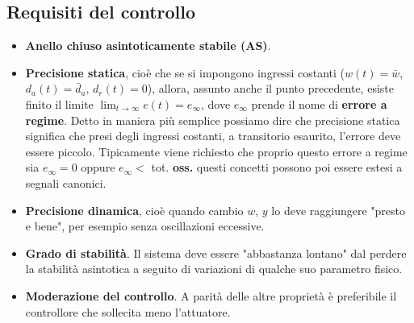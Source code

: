 \subsection{Requisiti del controllo}
\begin{itemize}
    \item \textbf{Anello chiuso asintoticamente stabile (AS)}.
    \item \textbf{Precisione statica}, cioè che se si impongono ingressi costanti ($w(t) = \bar{w}$, $d_a(t) = \bar{d}_a$, $d_r(t) = 0$), allora, assunto anche il punto precedente, esiste finito il limite $\lim_{t\rightarrow \infty} e(t) = e_{\infty}$, dove $e_\infty$ prende il nome di \textbf{errore a regime}. \newline
    Detto in maniera più semplice possiamo dire che precisione statica significa che presi degli ingressi costanti, a transitorio esaurito, l'errore deve essere piccolo.\newline
    Tipicamente viene richiesto che proprio questo errore a regime sia $e_\infty = 0$ oppure $e_\infty < $ tot.\newline
    \textbf{oss.} questi concetti possono poi essere estesi a segnali canonici.
    \item \textbf{Precisione dinamica}, cioè quando cambio $w$, $y$ lo deve raggiungere "presto e bene", per esempio senza oscillazioni eccessive.
    \item \textbf{Grado di stabilità}. Il sistema deve essere "abbastanza lontano" dal perdere la stabilità asintotica a seguito di variazioni di qualche suo parametro fisico.
    \item \textbf{Moderazione del controllo}. A parità delle altre proprietà è preferibile il controllore che sollecita meno l'attuatore.
\end{itemize}
\newpage
